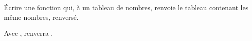 \question \'Ecrire une fonction  qui, à un tableau  de nombres, renvoie le tableau contenant les même nombres, renversé.

\begin{ex}
  Avec  ,  renverra \pyv{[7,3,6,2,5]}.
\end{ex}
